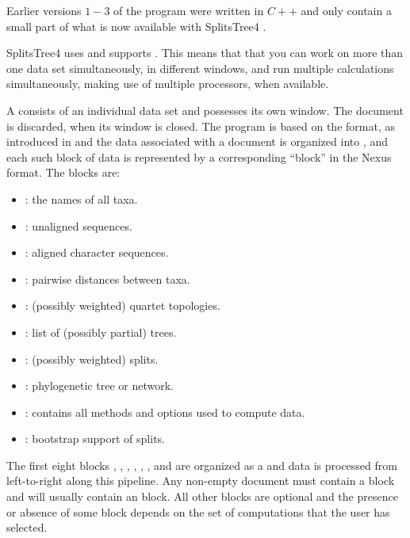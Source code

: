 \documentclass[11pt]{article}
\def\SplitsTree{{\sf SplitsTree4 }}
\begin{document}
Earlier versions $1-3$ of the program \cite{SplitsTree98}
were written in $C{+}{+}$
and only contain a small part of what is now available with \SplitsTree.

\SplitsTree uses  and supports .
This means that that you can work on more than one data set simultaneously,
in different windows, and run multiple calculations simultaneously,
making use of multiple processors, when available.

A  consists of an individual data set and possesses its own
 window. The document is discarded, when its window is closed.
The program
is based on the  format, as introduced in
\cite{NEXUS} and the data associated with a document is organized into
, and each such block of data is represented by a corresponding
``block'' in the Nexus format. The blocks are:
\begin{itemize}
\item {}: the names of all taxa.
\item {}: unaligned sequences.
\item {}: aligned character sequences.
\item {}: pairwise distances between taxa.
\item {}: (possibly weighted) quartet topologies.
\item {}: list of (possibly partial) trees.
\item {}: (possibly weighted) splits.
\item {}: phylogenetic tree or network.
\item {}: contains all methods and options
used to compute data.
\item {}: bootstrap support of splits.
\end{itemize}

The first eight blocks , , ,
, , , 
and  are organized as a  and data is processed
from left-to-right along this pipeline. Any non-empty document must contain
a  block and will usually contain an 
block. All other blocks are optional and the presence or absence of
some block depends on the set of computations that the user has selected.
\end{document}
